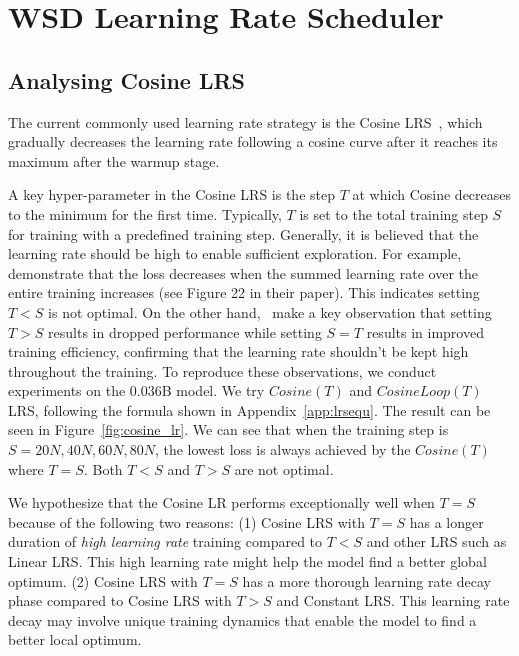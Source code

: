 \section{WSD Learning Rate Scheduler}
\label{sec:wsdlrs}
\subsection{Analysing Cosine LRS}

The current commonly used learning rate strategy is the Cosine LRS~\citep{kaplan2020scaling, hoffmann2022training, rae2021scaling, touvron2023llama, bai2023qwen, almazrouei2023falcon}, which gradually decreases the learning rate following a cosine curve after it reaches its maximum after the warmup stage. 

A key hyper-parameter in the Cosine LRS is the step $T$ at which Cosine decreases to the minimum for the first time. Typically, $T$ is set to the total training step $S$ for training with a predefined training step. Generally, it is believed that the learning rate should be high to enable sufficient exploration. For example, ~\cite{kaplan2020scaling} demonstrate that the loss decreases  when the summed learning rate over the entire training increases (see Figure 22 in their paper). This indicates setting $T < S$ is not optimal. On the other hand,~\cite{hoffmann2022training} make a key observation that setting $T > S$ results in dropped performance while setting $S = T$ results in improved training efficiency, confirming that the learning rate shouldn't be kept high throughout the training. To reproduce these observations, we conduct experiments on the 0.036B model. We try $Cosine(T)$ and $CosineLoop(T)$ LRS, following the formula shown in Appendix~\ref{app:lrsequ}. The result can be seen in Figure~\ref{fig:cosine_lr}. We can see that when the training step is $S=20N, 40N, 60N, 80N$, the lowest loss is always achieved by the $Cosine(T)$ where $T = S$. Both $T<S$ and $T>S$ are not optimal. 

We hypothesize that the Cosine LR performs exceptionally well when $T = S$ because of the following two reasons: (1) Cosine LRS with $T = S$ has a longer duration of \textit{high learning rate} training compared to $T < S$ and other LRS such as Linear LRS. This high learning rate might help the model find a better global optimum.
(2) Cosine LRS with $T = S$ has a more thorough learning rate decay phase compared to Cosine LRS with $T > S$ and Constant LRS. This learning rate decay may involve unique training dynamics that enable the model to find a better local optimum.


